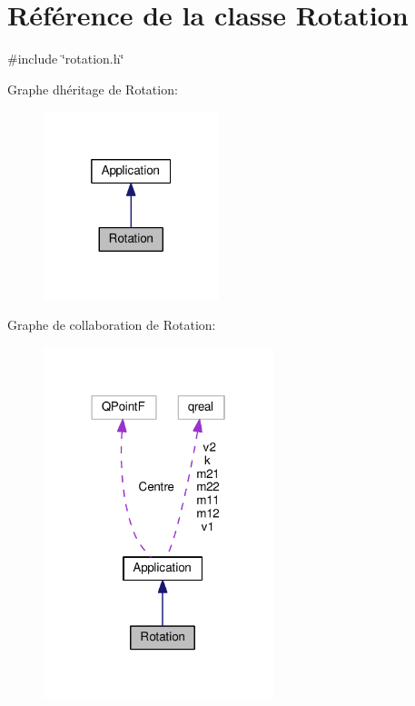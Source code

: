 \hypertarget{class_rotation}{}\section{Référence de la classe Rotation}
\label{class_rotation}


{\ttfamily \#include \char`\"{}rotation.\+h\char`\"{}}



Graphe d\textquotesingle{}héritage de Rotation\+:\nopagebreak
\begin{figure}[H]
\begin{center}
\leavevmode
\includegraphics[width=145pt]{class_rotation__inherit__graph}
\end{center}
\end{figure}


Graphe de collaboration de Rotation\+:\nopagebreak
\begin{figure}[H]
\begin{center}
\leavevmode
\includegraphics[width=190pt]{class_rotation__coll__graph}
\end{center}
\end{figure}
